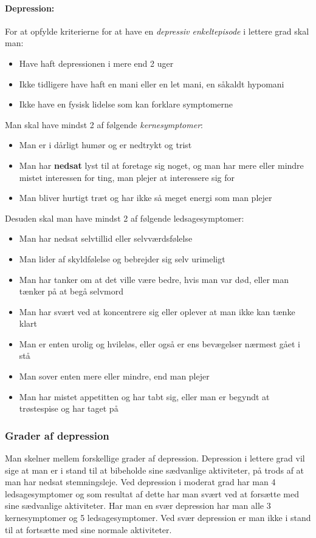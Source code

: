 \begin{mdframed}
\paragraph{Depression:}
For at opfylde kriterierne for at have en \textit{depressiv enkeltepisode} i lettere grad skal man:
\begin{itemize}
	\item Have haft depressionen i mere end 2 uger
	\item Ikke tidligere have haft en mani eller en let mani, en såkaldt hypomani
	\item Ikke have en fysisk lidelse som kan forklare symptomerne
\end{itemize}
Man skal have mindst 2 af følgende \textit{kernesymptomer}:
\begin{itemize}
	\item Man er i dårligt humør og er nedtrykt og trist
	\item Man har \textbf{nedsat} lyst til at foretage sig noget, og man har mere eller mindre mistet interessen for ting, man plejer at interessere sig for
	\item Man bliver hurtigt træt og har ikke så meget energi som man plejer
\end{itemize}
Desuden skal man have mindst 2 af følgende ledsagesymptomer:
\begin{itemize}
	\item Man har nedsat selvtillid eller selvværdsfølelse
	\item Man lider af skyldfølelse og bebrejder sig selv urimeligt
	\item Man har tanker om at det ville være bedre, hvis man var død, eller man tænker på at begå selvmord
	\item Man har svært ved at koncentrere sig eller oplever at man ikke kan tænke klart
	\item Man er enten urolig og hvileløs, eller også er ens bevægelser nærmest gået i stå
	\item Man sover enten mere eller mindre, end man plejer
	\item Man har mistet appetitten og har tabt sig, eller man er begyndt at trøstespise og har taget på
\end{itemize}
\end{mdframed}

\subsubsection{Grader af depression}
Man skelner mellem forskellige grader af depression.
Depression i lettere grad vil sige at man er i stand til at bibeholde sine sædvanlige aktiviteter, på trods af at man har nedsat stemningsleje.
Ved depression i moderat grad har man 4 ledsagesymptomer og som resultat af dette har man svært ved at forsætte med sine sædvanlige aktiviteter.
Har man en svær depression har man alle 3 kernesymptomer og 5 ledsagesymptomer.
Ved svær depression er man ikke i stand til at fortsætte med sine normale aktiviteter.

